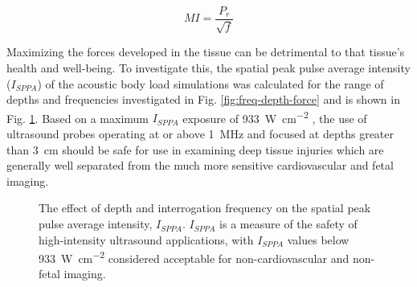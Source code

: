 			\begin{equation}
			\label{equ:mechanical_index}
				MI = \frac{P_r}{\sqrt{f}}
			\end{equation}

			Maximizing the forces developed in the tissue can be detrimental to that tissue's health and well-being. To investigate this, the spatial peak pulse average intensity ($I_{SPPA}$) of the acoustic body load simulations was calculated for the range of depths and frequencies investigated in Fig. \ref{fig:freq-depth-force} and is shown in Fig. \ref{fig:freq-depth-isppa}. Based on a maximum $I_{SPPA}$ exposure of \SI{933}{\W\per\cm\squared} \cite{hoskins10}, the use of ultrasound probes operating at or above \SI{1}{\MHz} and focused at depths greater than \SI{3}{\cm} should be safe for use in examining deep tissue injuries which are generally well separated from the much more sensitive cardiovascular and fetal imaging.

			\begin{figure}[!htb]
				\centering
				\caption[$I_{SPPA}$ safety measures of ARFI pulses]{The effect of depth and interrogation frequency on the spatial peak pulse average intensity, $I_{SPPA}$. $I_{SPPA}$ is a measure of the safety of high-intensity ultrasound applications, with $I_{SPPA}$ values below \SI{933}{\W\per\cm\squared} considered acceptable for non-cardiovascular and non-fetal imaging.}
				\label{fig:freq-depth-isppa}
			\end{figure}

